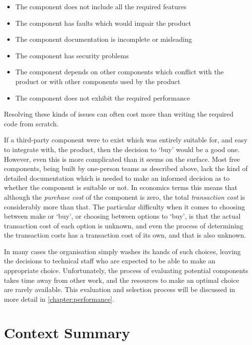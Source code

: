 \begin{itemize}
    \item The component does not include all the required features
    \item The component has faults which would impair the product
    \item The component documentation is incomplete or misleading
    \item The component has security problems
    \item The component depends on other components which conflict with the product or with other components used by the product
    \item The component does not exhibit the required performance
\end{itemize}

Resolving these kinds of issues can often cost more than writing the required code from scratch.

If a third-party component were to exist which was entirely suitable for, and easy to integrate with, the product, then the decision to `buy' would be a good one. However, even this is more complicated than it seems on the surface. Most free components, being built by one-person teams as described above, lack the kind of detailed documentation which is needed to make an informed decision as to whether the component is suitable or not. In economics terms this means that although the \emph{purchase cost} of the component is zero, the total \emph{transaction cost} \citep{OECD2003} is considerably more than that. The particular difficulty when it comes to choosing between make or `buy', or choosing between options to `buy', is that the actual transaction cost of each option is unknown, and even the process of determining the transaction costs has a transaction cost of its own, and that is also unknown.

In many cases the organisation simply washes its hands of such choices, leaving the decisions to technical staff who are expected to be able to make an appropriate choice. Unfortunately, the process of evaluating potential components takes time away from other work, and the resources to make an optimal choice are rarely available. This evaluation and selection process will be discussed in more detail in \autoref{chapter:performance}.

\section{Context Summary}
\label{section:motivation summary}

